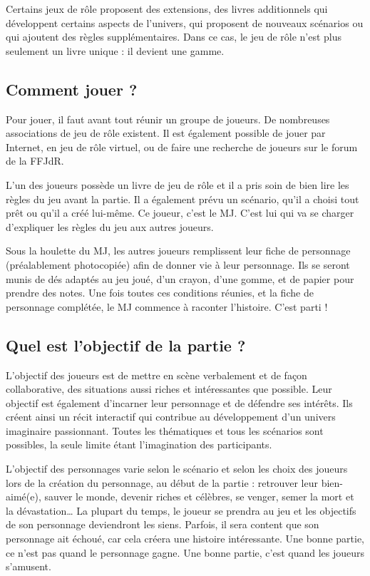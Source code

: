 \documentclass[twoside,12pt,english]{book}
\begin{document}
Certains jeux de rôle proposent des extensions, des livres additionnels qui développent certains aspects de l’univers, qui proposent de nouveaux scénarios ou qui ajoutent des règles supplémentaires. Dans ce cas, le jeu de rôle n’est plus seulement un livre unique : il devient une gamme.

\subsection*{Comment jouer ?}

Pour jouer, il faut avant tout réunir un groupe de joueurs. De nombreuses associations de jeu de rôle existent. Il est également possible de jouer par Internet, en jeu de rôle virtuel, ou de faire une recherche de joueurs sur le forum de la FFJdR.

L’un des joueurs possède un livre de jeu de rôle et il a pris soin de bien lire les règles du jeu avant la partie. Il a également prévu un scénario, qu’il a choisi tout prêt ou qu’il a créé lui-même. Ce joueur, c’est le MJ. C’est lui qui va se charger d’expliquer les règles du jeu aux autres joueurs.

Sous la houlette du MJ, les autres joueurs remplissent leur fiche de personnage (préalablement photocopiée) afin de donner vie à leur personnage. Ils se seront munis de dés adaptés au jeu joué, d’un crayon, d’une gomme, et de papier pour prendre des notes. Une fois toutes ces conditions réunies, et la fiche de personnage complétée, le MJ commence à raconter l’histoire. C’est parti !

\subsection*{Quel est l’objectif de la partie ?}

L’objectif des joueurs est de mettre en scène verbalement et de façon collaborative, des situations aussi riches et intéressantes que possible. Leur objectif est également d’incarner leur personnage et de défendre ses intérêts. Ils créent ainsi un récit interactif qui contribue au développement d’un univers imaginaire passionnant. Toutes les thématiques et tous les scénarios sont possibles, la seule limite étant l’imagination des participants.

L’objectif des personnages varie selon le scénario et selon les choix des joueurs lors de la création du personnage, au début de la partie : retrouver leur bien-aimé(e), sauver le monde, devenir riches et célèbres, se venger, semer la mort et la dévastation… La plupart du temps, le joueur se prendra au jeu et les objectifs de son personnage deviendront les siens. Parfois, il sera content que son personnage ait échoué, car cela créera une histoire intéressante. Une bonne partie, ce n’est pas quand le personnage gagne. Une bonne partie, c’est quand les joueurs s’amusent.
\end{document}
